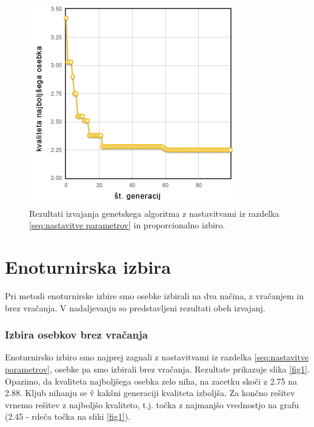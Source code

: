 \documentclass[a4paper, 12pt]{book}
\begin{document}
\begin{figure}
\centering
\includegraphics[scale=0.70]{prop_izbira.png}
\caption{Rezultati izvajanja genetskega algoritma z nastavitvami iz razdelka \ref{seq:nastavitve parametrov} in proporcionalno izbiro.}
\label{res:proporcionalna izbira}
\end{figure}

\section{Enoturnirska izbira}
Pri metodi enoturnirske izbire smo osebke izbirali na dva na\v cina, z vra\v canjem in brez vra\v canja. V nadaljevanju so predstavljeni rezultati obeh izvajanj.

\subsubsection{Izbira osebkov brez vra\v canja}
Enoturnirsko izbiro smo najprej zagnali z nastavitvami iz razdelka \ref{seq:nastavitve parametrov}, osebke pa smo izbirali brez vra\v canja. Rezultate prikazuje slika \ref{fig1}. Opazimo, da kvaliteta najbolj\v sega osebka zelo niha, na zacetku sko\v ci z 2.75 na 2.88. Kljub nihanju se \v v kak\v sni generaciji kvaliteta izbolj\v sa. Za kon\v cno re\v sitev vrnemo re\v sitev z najbolj\v so kvaliteto, t.j. to\v cka z najmanj\v so vrednostjo na grafu (2.45 - rde\v ca to\v cka na sliki \ref{fig1}).
\end{document}
